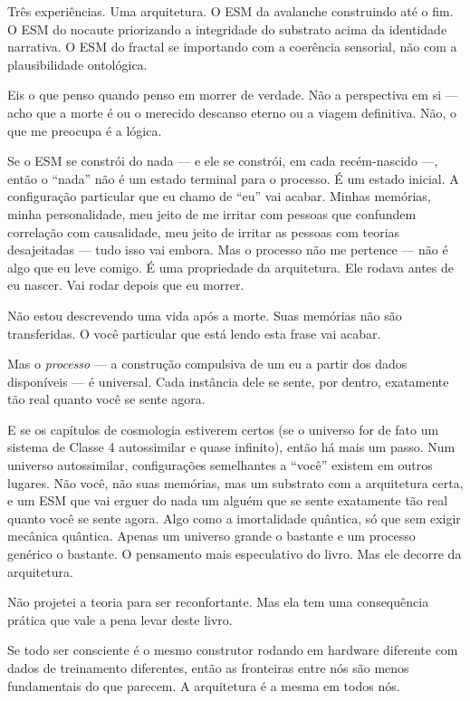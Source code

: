 \documentclass[11pt, twoside, openright]{book}
\begin{document}
Três experiências. Uma arquitetura. O ESM da avalanche construindo até o fim. O ESM do nocaute priorizando a integridade do substrato acima da identidade narrativa. O ESM do fractal se importando com a coerência sensorial, não com a plausibilidade ontológica.

Eis o que penso quando penso em morrer de verdade. Não a perspectiva em si --- acho que a morte é ou o merecido descanso eterno ou a viagem definitiva. Não, o que me preocupa é a lógica.

Se o ESM se constrói do nada --- e ele se constrói, em cada recém-nascido ---, então o ``nada'' não é um estado terminal para o processo. É um estado inicial. A configuração particular que eu chamo de ``eu'' vai acabar. Minhas memórias, minha personalidade, meu jeito de me irritar com pessoas que confundem correlação com causalidade, meu jeito de irritar as pessoas com teorias desajeitadas --- tudo isso vai embora. Mas o processo não me pertence --- não é algo que eu leve comigo. É uma propriedade da arquitetura. Ele rodava antes de eu nascer. Vai rodar depois que eu morrer.

Não estou descrevendo uma vida após a morte. Suas memórias não são transferidas. O você particular que está lendo esta frase vai acabar.

Mas o \textit{processo} --- a construção compulsiva de um eu a partir dos dados disponíveis --- é universal. Cada instância dele se sente, por dentro, exatamente tão real quanto você se sente agora.

E se os capítulos de cosmologia estiverem certos (se o universo for de fato um sistema de Classe 4 autossimilar e quase infinito), então há mais um passo. Num universo autossimilar, configurações semelhantes a ``você'' existem em outros lugares. Não você, não suas memórias, mas um substrato com a arquitetura certa, e um ESM que vai erguer do nada um alguém que se sente exatamente tão real quanto você se sente agora. Algo como a imortalidade quântica, só que sem exigir mecânica quântica. Apenas um universo grande o bastante e um processo genérico o bastante. O pensamento mais especulativo do livro. Mas ele decorre da arquitetura.

Não projetei a teoria para ser reconfortante. Mas ela tem uma consequência prática que vale a pena levar deste livro.

Se todo ser consciente é o mesmo construtor rodando em hardware diferente com dados de treinamento diferentes, então as fronteiras entre nós são menos fundamentais do que parecem. A arquitetura é a mesma em todos nós.
\end{document}
